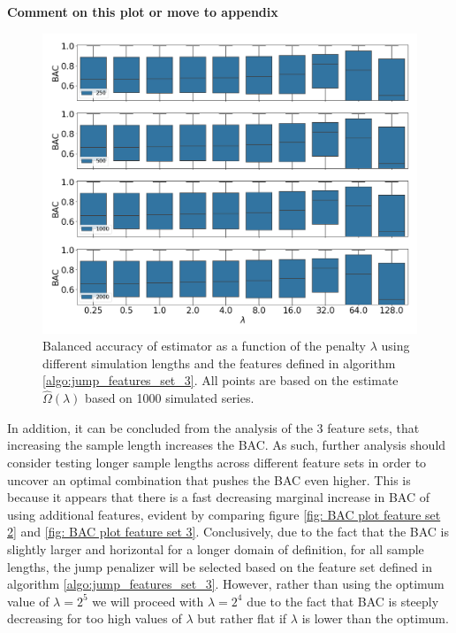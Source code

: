 \textbf{Comment on this plot or move to appendix}

\begin{figure}[H] 
    \centering
    \includegraphics[width=1\textwidth]{analysis/model_convergence/images/jump_penalties_feature_set_3_box.png}
    \caption [Boxplot of BAC for \jump using feature set 3]{Balanced accuracy of \jump estimator as a function of the penalty $\lambda$ using different simulation lengths and the features defined in algorithm \ref{algo:jump_features_set_3}. All points are based on the estimate $\hat{\Omega} (\lambda)$ based on 1000 simulated series.}
    \label{fig: BAC plot feature set 3 box}
\end{figure}

In addition, it can be concluded from the analysis of the 3 feature sets, that increasing the sample length increases the BAC. As such, further analysis should consider testing longer sample lengths across different feature sets in order to uncover an optimal combination that pushes  the BAC even higher. This is because it appears that there is a fast decreasing marginal increase in BAC of using additional features, evident by comparing figure \ref{fig: BAC plot feature set 2} and \ref{fig: BAC plot feature set 3}. Conclusively, due to the fact that the BAC is slightly larger and horizontal for a longer domain of definition, for all sample lengths, the jump penalizer will be selected based on the feature set defined in algorithm \ref{algo:jump_features_set_3}. However, rather than using the optimum value of $\lambda=2^5$ we will proceed with $\lambda=2^4$ due to the fact that BAC is steeply decreasing for too high values of $\lambda$ but rather flat if $\lambda$ is lower than the optimum.

